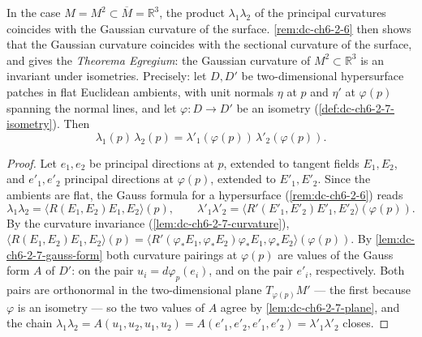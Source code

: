 \begin{remark}
  \label{rem:dc-ch6-2-7}


  In the case $M=M^2\subset\overline{M}=\mathbb{R}^3$, the product $\lambda_1\lambda_2$
  of the principal curvatures coincides with the Gaussian curvature of the surface.
  \cref{rem:dc-ch6-2-6} then shows that the Gaussian curvature coincides with the sectional
  curvature of the surface, and gives the \emph{Theorema Egregium}:
  the Gaussian curvature of $M^2\subset\mathbb{R}^3$ is an invariant under
  isometries. Precisely: let $D,D'$ be two-dimensional hypersurface patches in
  flat Euclidean ambients, with unit normals $\eta$ at $p$ and $\eta'$ at
  $\varphi(p)$ spanning the normal lines, and let $\varphi:D\to D'$ be an
  isometry (\cref{def:dc-ch6-2-7-isometry}). Then
  $$
  \lambda_1(p)\,\lambda_2(p)=\lambda'_1(\varphi(p))\,\lambda'_2(\varphi(p)).
  $$
\end{remark}
\begin{proof}

  \sketch
  Let $e_1,e_2$ be principal directions at $p$, extended to tangent fields
  $E_1,E_2$, and $e'_1,e'_2$ principal directions at $\varphi(p)$, extended to
  $E'_1,E'_2$. Since the ambients are flat, the Gauss formula for a
  hypersurface (\cref{rem:dc-ch6-2-6}) reads
  $$
  \lambda_1\lambda_2=\langle R(E_1,E_2)E_1,E_2\rangle(p),
  \qquad
  \lambda'_1\lambda'_2=\langle R'(E'_1,E'_2)E'_1,E'_2\rangle(\varphi(p)).
  $$
  By the curvature invariance (\cref{lem:dc-ch6-2-7-curvature}),
  $\langle R(E_1,E_2)E_1,E_2\rangle(p)
    =\langle R'(\varphi_*E_1,\varphi_*E_2)\varphi_*E_1,\varphi_*E_2\rangle(\varphi(p))$.
  By \cref{lem:dc-ch6-2-7-gauss-form} both curvature pairings at
  $\varphi(p)$ are values of the Gauss form $A$ of $D'$: on the pair
  $u_i=d\varphi_p(e_i)$, and on the pair $e'_i$, respectively. Both pairs are
  orthonormal in the two-dimensional plane $T_{\varphi(p)}M'$ — the first
  because $\varphi$ is an isometry — so the two values of $A$ agree by
  \cref{lem:dc-ch6-2-7-plane}, and the chain
  $\lambda_1\lambda_2
    =A(u_1,u_2,u_1,u_2)=A(e'_1,e'_2,e'_1,e'_2)=\lambda'_1\lambda'_2$
  closes.
\end{proof}

